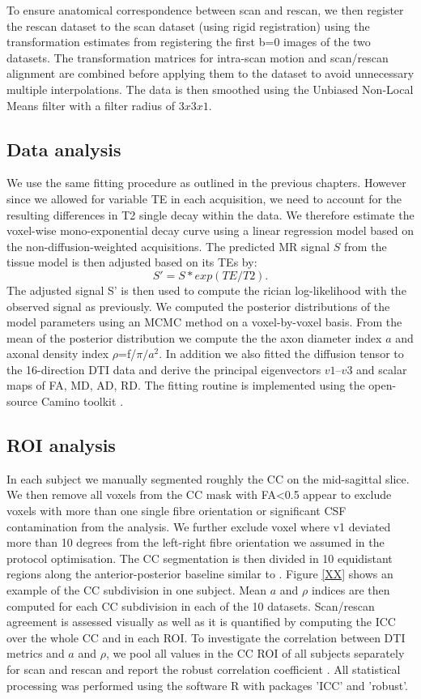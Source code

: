 To ensure anatomical correspondence between scan and rescan, we then register the rescan dataset to the scan dataset (using rigid registration) using the transformation estimates from registering  the first b=0 images of the two datasets. The transformation matrices for intra-scan motion and scan/rescan alignment are combined before applying them to the dataset to avoid unnecessary multiple interpolations. The data is then smoothed using the Unbiased Non-Local Means filter \citep{Aja-Fernandez:2010} with a filter radius of $3x3x1$.

\subsection*{Data analysis}
We use the same fitting procedure as outlined in the previous chapters. However since we allowed for variable TE in each acquisition, we need to account for the resulting differences in T2 single decay within the data. We therefore estimate the voxel-wise mono-exponential decay curve using a linear regression model based on the non-diffusion-weighted acquisitions. The predicted MR signal $S$ from the tissue model is then adjusted based on its \glspl{TE} by:
\begin{equation}
	S' = S * exp(TE/T2).
\end{equation}
The adjusted signal S' is then used to compute the rician log-likelihood with the observed signal as previously. We computed the posterior distributions of the model parameters using an MCMC method on a voxel-by-voxel basis. From the mean of the posterior distribution we compute the the axon diameter index $a$ and axonal density index $\rho$=f/$\pi/a^2$. In addition we also fitted the diffusion tensor to the 16-direction DTI data and derive the principal eigenvectors $v1$--$v3$ and scalar maps of FA, MD, AD, RD. The fitting routine is implemented using the open-source Camino toolkit \citep{Cook:2006}.
\subsection*{ROI analysis} In each subject we manually segmented roughly the CC on the mid-sagittal slice. We then remove all voxels from the CC mask with FA<0.5 appear to exclude voxels with more than one single fibre orientation or significant CSF contamination from the analysis. We further exclude voxel where v1 deviated more than 10 degrees from the left-right fibre orientation we assumed in the protocol optimisation. The CC segmentation is then divided in 10 equidistant regions along the anterior-posterior baseline similar to \cite{Aboitiz}. Figure \ref{XX} shows an example of the CC subdivision in one subject. Mean $a$ and $\rho$ indices are then computed for each CC subdivision in each of the 10 datasets. Scan/rescan agreement is assessed visually as well as it is quantified by computing the \gls{ICC} \citep{Shrout:1979} over the whole CC and in each \gls{ROI}. To investigate the correlation between DTI metrics and $a$ and $\rho$, we pool all values in the CC ROI of all subjects separately for scan and rescan and report the robust correlation coefficient \citep{XX}. All statistical processing was performed using the software R\citep{RCoreTeam:2012} with packages 'ICC'\citep{Wolak:2011} and 'robust'\citep{Wang:2012}.
\FloatBarrier
